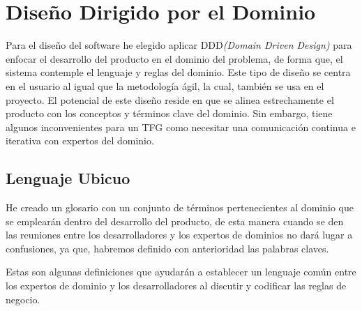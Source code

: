 \chapter{Diseño Dirigido por el Dominio}

Para el diseño del software he elegido aplicar DDD\textit{(Domain Driven Design)} para enfocar el 
desarrollo del producto en el dominio del problema, de forma que, el sistema contemple el lenguaje y reglas 
del dominio. Este tipo de diseño se centra en el usuario al igual que la metodología ágil, la cual,
también se usa en el proyecto. El potencial de este diseño reside en que se alinea estrechamente el producto
con los conceptos y términos clave del dominio. Sin embargo, tiene algunos inconvenientes para un TFG como
necesitar una comunicación continua e iterativa con expertos del dominio.

\section{Lenguaje Ubicuo}
He creado un glosario con un conjunto de términos pertenecientes al dominio que se emplearán dentro del desarrollo del producto, 
de esta manera cuando se den las reuniones entre los desarrolladores y los expertos de dominios no dará lugar a confusiones, 
ya que, habremos definido con anterioridad las palabras claves.

Estas son algunas definiciones que ayudarán a establecer un lenguaje común entre los expertos de dominio y los
desarrolladores al discutir y codificar las reglas de negocio.
 
